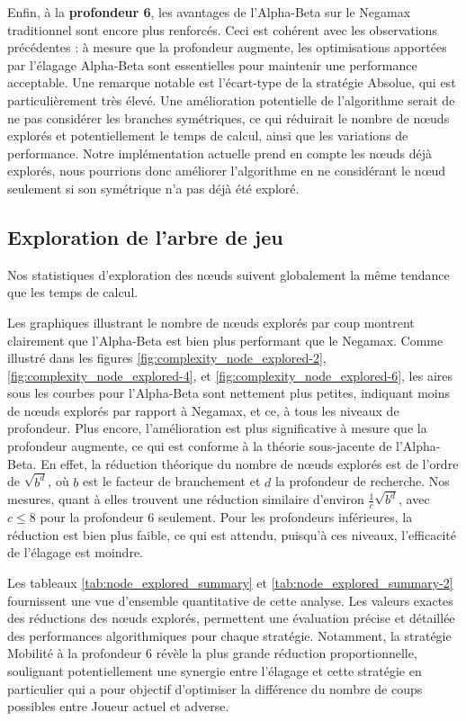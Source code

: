 Enfin, à la \textbf{profondeur 6}, les avantages de l'Alpha-Beta sur le Negamax traditionnel sont encore plus renforcés. Ceci est cohérent avec les observations précédentes : à mesure que la profondeur augmente, les optimisations apportées par l'élagage Alpha-Beta sont essentielles pour maintenir une performance acceptable. Une remarque notable est l'écart-type de la stratégie Absolue, qui est particulièrement très élevé. Une amélioration potentielle de l'algorithme serait de ne pas considérer les branches symétriques, ce qui réduirait le nombre de nœuds explorés et potentiellement le temps de calcul, ainsi que les variations de performance. Notre implémentation actuelle prend en compte les nœuds déjà explorés, nous pourrions donc améliorer l'algorithme en ne considérant le nœud seulement si son symétrique n'a pas déjà été exploré.


\subsection{Exploration de l'arbre de jeu}
Nos statistiques d'exploration des nœuds suivent globalement la même tendance que les temps de calcul.

Les graphiques illustrant le nombre de nœuds explorés par coup montrent clairement que l'Alpha-Beta est bien plus performant que le Negamax. Comme illustré dans les figures \ref{fig:complexity_node_explored-2}, \ref{fig:complexity_node_explored-4}, et \ref{fig:complexity_node_explored-6}, les aires sous les courbes pour l'Alpha-Beta sont nettement plus petites, indiquant moins de nœuds explorés par rapport à Negamax, et ce, à tous les niveaux de profondeur. Plus encore, l'amélioration est plus significative à mesure que la profondeur augmente, ce qui est conforme à la théorie sous-jacente de l'Alpha-Beta. En effet, la réduction théorique du nombre de nœuds explorés est de l'ordre de $\sqrt{b^d}$, où $b$ est le facteur de branchement et $d$ la profondeur de recherche. Nos mesures, quant à elles trouvent une réduction similaire d'environ $\frac{1}{c}\sqrt{b^d}$, avec $c\leq8$ pour la profondeur 6 seulement. Pour les profondeurs inférieures, la réduction est bien plus faible, ce qui est attendu, puisqu'à ces niveaux, l'efficacité de l'élagage est moindre.

Les tableaux \ref{tab:node_explored_summary} et \ref{tab:node_explored_summary-2} fournissent une vue d'ensemble quantitative de cette analyse. Les valeurs exactes des réductions des nœuds explorés, permettent une évaluation précise et détaillée des performances algorithmiques pour chaque stratégie. Notamment, la stratégie Mobilité à la profondeur 6 révèle la plus grande réduction proportionnelle, soulignant potentiellement une synergie entre l'élagage et cette stratégie en particulier qui a pour objectif d'optimiser la différence du nombre de coups possibles entre Joueur actuel et adverse.

